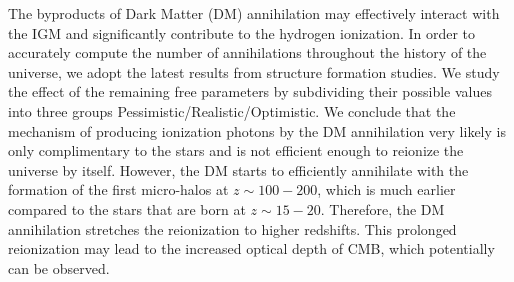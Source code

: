 The byproducts of Dark Matter (DM) annihilation may effectively interact with the IGM and significantly contribute to the hydrogen ionization. In order to accurately compute the number of annihilations throughout the history of the universe, we adopt the latest results from structure formation studies. We study the effect of the remaining free parameters by subdividing their possible values into three groups Pessimistic/Realistic/Optimistic. We conclude that the mechanism of producing ionization photons by the DM annihilation very likely is only complimentary to the stars and is not efficient enough to reionize the universe by itself. However, the DM starts to efficiently annihilate with the formation of the first micro-halos at $z\sim100-200$, which is much earlier compared to the stars that are born at $z\sim15-20$. Therefore, the DM annihilation stretches the reionization to higher redshifts. This prolonged reionization may lead to the increased optical depth of CMB, which potentially can be observed.